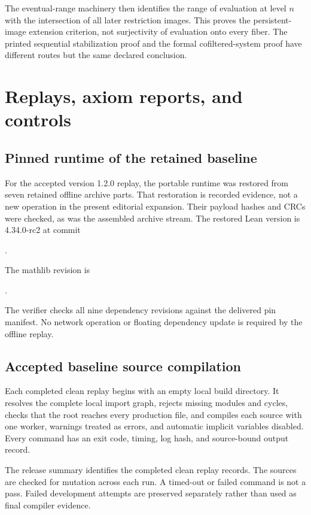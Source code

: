 \documentclass[11pt]{article}
\begin{document}
The eventual-range machinery then identifies the range of evaluation at level \(n\) with the intersection of all later restriction images. This proves the persistent-image extension criterion, not surjectivity of evaluation onto every fiber. The printed sequential stabilization proof and the formal cofiltered-system proof have different routes but the same declared conclusion.

\section{Replays, axiom reports, and controls}
\subsection{Pinned runtime of the retained baseline}
For the accepted version 1.2.0 replay, the portable runtime was restored from seven retained offline archive parts. That restoration is recorded evidence, not a new operation in the present editorial expansion. Their payload hashes and CRCs were checked, as was the assembled archive stream. The restored Lean version is 4.34.0-rc2 at commit
\begin{center}\small{}.\end{center}
The mathlib revision is
\begin{center}\small{}.\end{center}
The verifier checks all nine dependency revisions against the delivered pin manifest. No network operation or floating dependency update is required by the offline replay.

\subsection{Accepted baseline source compilation}
Each completed clean replay begins with an empty local build directory. It resolves the complete local import graph, rejects missing modules and cycles, checks that the root reaches every production file, and compiles each source with one worker, warnings treated as errors, and automatic implicit variables disabled. Every command has an exit code, timing, log hash, and source-bound output record.

The release summary identifies the completed clean replay records. The sources are checked for mutation across each run. A timed-out or failed command is not a pass. Failed development attempts are preserved separately rather than used as final compiler evidence.
\end{document}

